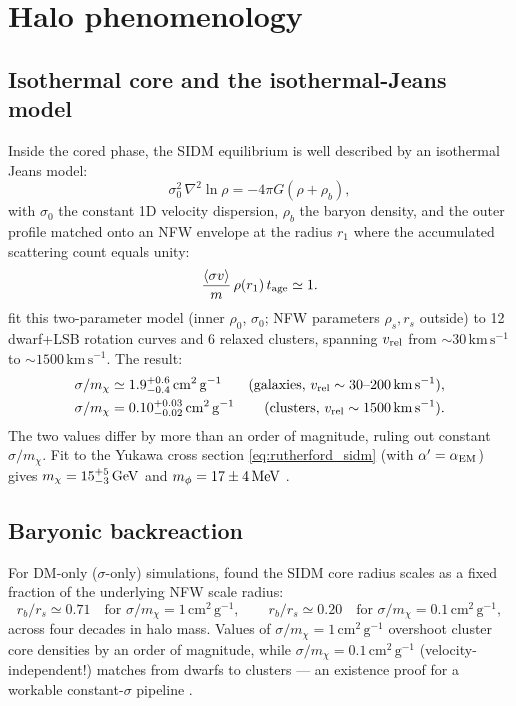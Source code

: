 \documentclass[12pt]{article}
\newcommand{\cmg}{\,\mathrm{cm^2\,g^{-1}}}
\newcommand{\kms}{\,\mathrm{km\,s^{-1}}}
\newcommand{\smx}{\sigma/m_\chi}
\newcommand{\vrel}{v_{\rm rel}}
\begin{document}
\section{Halo phenomenology}
\label{sec:halo}

\subsection{Isothermal core and the isothermal-Jeans model}

Inside the cored phase, the SIDM equilibrium is well described by an
isothermal Jeans model:
%
\begin{equation}
  \sigma_0^2\,\nabla^2\ln\rho = -4\pi G(\rho+\rho_b),
  \label{eq:isothermal_jeans}
\end{equation}
%
with $\sigma_0$ the constant 1D velocity dispersion, $\rho_b$ the
baryon density, and the outer profile matched onto an NFW envelope at
the radius $r_1$ where the accumulated scattering count equals unity:
%
\begin{equation}
  \frac{\langle\sigma v\rangle}{m}\,\rho(r_1)\,t_{\rm age} \simeq 1.
  \label{eq:r1_def}
\end{equation}
%
\citet{Kaplinghat2016} fit this two-parameter model
(inner $\rho_0$, $\sigma_0$; NFW parameters $\rho_s, r_s$ outside) to
12 dwarf+LSB rotation curves and 6 relaxed clusters, spanning
$\vrel$ from $\sim 30\kms$ to $\sim 1500\kms$.  The result:
%
\begin{align}
  \smx &\simeq 1.9^{+0.6}_{-0.4}\cmg
        & \text{(galaxies, }\vrel \sim 30\text{--}200\kms\text{)},
   \\
  \smx &= 0.10^{+0.03}_{-0.02}\cmg
        & \text{(clusters, }\vrel \sim 1500\kms\text{)}.
\end{align}
%
The two values differ by more than an order of magnitude, ruling out
constant $\smx$.  Fit to the Yukawa cross section
\eqref{eq:rutherford_sidm} (with $\alpha' = \alpha_{\rm EM}$) gives
$m_\chi = 15^{+5}_{-3}\,{\rm GeV}$ and $m_\phi = 17\pm 4\,{\rm MeV}$
\citep{Kaplinghat2016}.

\subsection{Baryonic backreaction}
\label{sec:baryons}

For DM-only ($\sigma$-only) simulations, \citet{Rocha2013} found the
SIDM core radius scales as a fixed fraction of the underlying NFW
scale radius:
%
\begin{equation}
  r_b/r_s \simeq 0.71\quad\text{for }\smx = 1\cmg,
  \qquad
  r_b/r_s \simeq 0.20\quad\text{for }\smx = 0.1\cmg,
\end{equation}
%
across four decades in halo mass.  Values of $\smx = 1\cmg$ overshoot
cluster core densities by an order of magnitude, while
$\smx = 0.1\cmg$ (velocity-independent!) matches from dwarfs to
clusters --- an existence proof for a workable constant-$\sigma$ pipeline
\citep{Rocha2013}.
\end{document}
